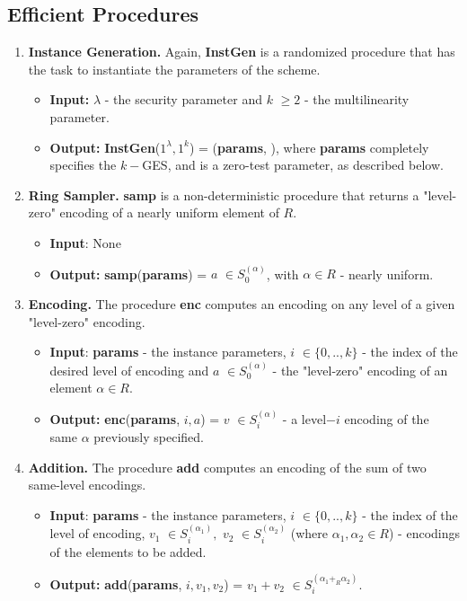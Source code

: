 \subsection{Efficient Procedures}
\begin{enumerate}[label=(\alph*)]
	\item \textbf{Instance Generation.}	 Again, \textbf{InstGen} is a randomized procedure that has the task to instantiate the parameters of the scheme.
	\begin{itemize}
		\item \textbf{Input:} {\boldmath$\lambda$} - the security parameter and {\boldmath$k$} $\geq 2$ - the multilinearity parameter.
		\item \textbf{Output:} \textbf{InstGen}($1^\lambda, 1^k$) = (\textbf{params}, \pzt), where \textbf{params} completely specifies the $k-$GES, and {\pzt}  is a zero-test parameter, as described below.
	\end{itemize}

	\newpage
	\item \textbf{Ring Sampler.} \textbf{samp} is a non-deterministic procedure that returns a "level-zero" encoding of a nearly uniform element of $R$.
		\begin{itemize}
		\item \textbf{Input}: None
		\item \textbf{Output:} \textbf{samp}(\textbf{params}) = {\boldmath$a$} $\in S_0^{(\alpha)}$, with $\alpha\in R$ - nearly uniform.
	\end{itemize}

	\item \textbf{Encoding.} The procedure \textbf{enc} computes an encoding on any level of a given "level-zero" encoding.
	\begin{itemize}
		\item \textbf{Input}: \textbf{params} - the instance parameters, {\boldmath$i$} $\in \{0,..,k\}$ - the index of the desired level of encoding and {\boldmath$a$} $\in S_0^{(\alpha)}$ - the "level-zero" encoding of an element $\alpha \in R$.
		\item \textbf{Output:} \textbf{enc}(\textbf{params}, $i, a$) = {\boldmath$v$} $\in S_i^{(\alpha)}$ - a level$-i$ encoding of the same $\alpha$ previously specified.
	\end{itemize}

	\item \textbf{Addition.} The procedure \textbf{add} computes an encoding of the sum of two same-level encodings.
	\begin{itemize}
		\item \textbf{Input}: \textbf{params} - the instance parameters, {\boldmath$i$} $\in \{0,..,k\}$ - the index of the level of encoding, {\boldmath$v_1$} $\in S_i^{(\alpha_1)},$ {\boldmath$v_2$} $\in S_i^{(\alpha_2)}$ (where $\alpha_1, \alpha_2\in R$) - encodings of the elements to be added.
		\item \textbf{Output:} \textbf{add}(\textbf{params}, $i, v_1, v_2$) = {\boldmath$ v_1 + v_2$} $ \in S_i^{(\alpha_1 +_R \alpha_2)}$.
	\end{itemize}


\end{enumerate}
